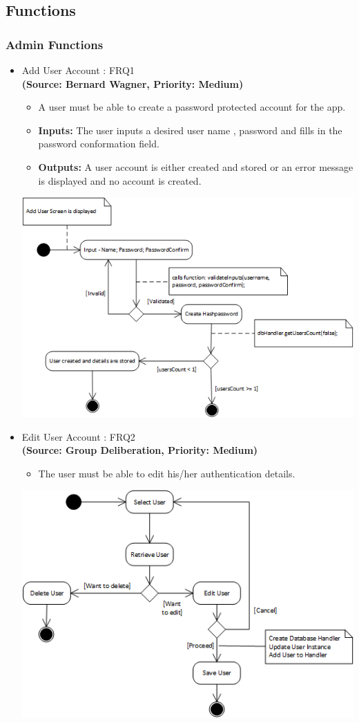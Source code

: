 \subsection{Functions}
\subsubsection{Admin Functions}
\begin{itemize}
\item{Add User Account : FRQ1}\\
\textbf{(Source: Bernard Wagner, Priority: Medium)}
\begin{itemize}
\item A user must be able to create a password protected account for the app.
\item \textbf{Inputs:} The user inputs a desired user name , password and fills in the password conformation field.
\item \textbf{Outputs:} A user account is either created and stored or an error message is displayed and no account is created.
\end{itemize}
 \includegraphics[width=13cm]{diagrams/StateDiagrams/AddUserStateDiagram.png}
\item{Edit User Account : FRQ2}\\
\textbf{(Source: Group Deliberation, Priority: Medium)}
\begin{itemize}
\item The user must be able to edit his/her authentication details.
\end{itemize}
 \includegraphics[width=13cm]{diagrams/StateDiagrams/EditUserStateDiagram.png}

\end{itemize}

